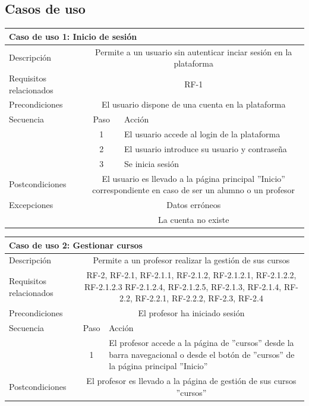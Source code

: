 \newpage
\subsection{Casos de uso}

\begin{adjustwidth}{-2cm}{}
\begin{tabular}[H]{l c l}
\toprule 
\multicolumn{3}{l}{\textbf{Caso de uso 1: Inicio de sesión}}\\
\midrule
Descripción & \multicolumn{2}{p{10cm}}{Permite a un usuario sin autenticar inciar sesión en la plataforma}\\
\midrule
Requisitos relacionados & \multicolumn{2}{p{10cm}}{RF-1}\\
\midrule
Precondiciones & \multicolumn{2}{p{10cm}}{El usuario dispone de una cuenta en la plataforma }\\
\midrule
Secuencia & Paso & Acción \\
\cmidrule{2-3}
         & 1 & El usuario accede al login de la plataforma \\
         & 2 & El usuario introduce su usuario y contraseña\\
         & 3 & Se inicia sesión\\
\midrule
Postcondiciones & \multicolumn{2}{p{10cm}}{El usuario es llevado a la página principal ''Inicio'' correspondiente en caso de ser un alumno o un profesor}\\
\midrule
Excepciones & \multicolumn{2}{p{10cm}}{Datos erróneos}\\
            & \multicolumn{2}{p{10cm}}{La cuenta no existe}\\
\bottomrule 
\end{tabular}


\hspace{3cm}

\begin{tabular}[H]{l c l}
\toprule 
\multicolumn{3}{l}{\textbf{Caso de uso 2: Gestionar cursos}}\\
\midrule
Descripción & \multicolumn{2}{p{10cm}}{Permite a un profesor realizar la gestión de sus cursos}\\
\midrule
Requisitos relacionados & \multicolumn{2}{p{10cm}}{RF-2, RF-2.1, RF-2.1.1, RF-2.1.2, RF-2.1.2.1, RF-2.1.2.2, RF-2.1.2.3
RF-2.1.2.4, RF-2.1.2.5, RF-2.1.3, RF-2.1.4, RF-2.2, RF-2.2.1, RF-2.2.2,  RF-2.3,  RF-2.4}\\
\midrule
Precondiciones & \multicolumn{2}{p{10cm}}{El profesor ha iniciado sesión}\\
\midrule
Secuencia & Paso & Acción \\
\cmidrule{2-3}
         & 1 & \multicolumn{1}{p{8cm}}{El profesor accede a la página de ''cursos'' desde la barra navegacional o desde el botón de ''cursos'' de la página principal ''Inicio''} \\
\midrule
Postcondiciones & \multicolumn{2}{p{10cm}}{El profesor es llevado a la página de gestión de sus cursos ''cursos''}\\
\bottomrule 
\end{tabular}
\end{adjustwidth}

